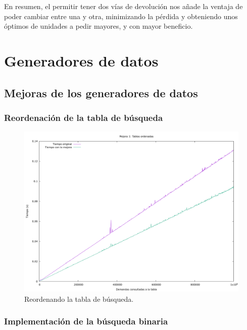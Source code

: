 \documentclass[12pt, spanish]{article}
\begin{document}
En resumen, el permitir tener dos vías de devolución nos añade la ventaja de poder cambiar entre una y otra, minimizando la pérdida y obteniendo unos óptimos de unidades a pedir mayores, y con mayor beneficio.


\section{Generadores de datos}

\subsection{Mejoras de los generadores de datos}

\subsubsection{Reordenación de la tabla de búsqueda}

\begin{figure}[H]
	\centering
	\includegraphics[scale = 0.2]{t_mejora1.png}
	\caption{Reordenando la tabla de búsqueda.}
	\label{fig:ej1_a_150000}

\end{figure}


\subsubsection{Implementación de la búsqueda binaria}
\end{document}
